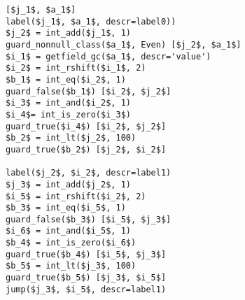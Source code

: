 \begin{lstlisting}[mathescape]
[$j_1$, $a_1$]
label($j_1$, $a_1$, descr=label0))
$j_2$ = int_add($j_1$, 1)
guard_nonnull_class($a_1$, Even) [$j_2$, $a_1$]
$i_1$ = getfield_gc($a_1$, descr='value')
$i_2$ = int_rshift($i_1$, 2)
$b_1$ = int_eq($i_2$, 1)
guard_false($b_1$) [$i_2$, $j_2$]
$i_3$ = int_and($i_2$, 1)
$i_4$= int_is_zero($i_3$)
guard_true($i_4$) [$i_2$, $j_2$]
$b_2$ = int_lt($j_2$, 100)
guard_true($b_2$) [$j_2$, $i_2$]

label($j_2$, $i_2$, descr=label1)
$j_3$ = int_add($j_2$, 1)
$i_5$ = int_rshift($i_2$, 2)
$b_3$ = int_eq($i_5$, 1)
guard_false($b_3$) [$i_5$, $j_3$]
$i_6$ = int_and($i_5$, 1)
$b_4$ = int_is_zero($i_6$)
guard_true($b_4$) [$i_5$, $j_3$]
$b_5$ = int_lt($j_3$, 100)
guard_true($b_5$) [$j_3$, $i_5$]
jump($j_3$, $i_5$, descr=label1)
\end{lstlisting}
